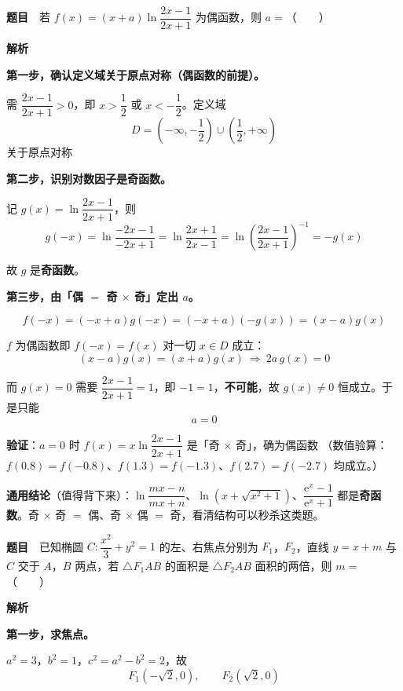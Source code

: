 \par\medskip


\textbf{题目}　若 $f(x)=(x+a)\ln\dfrac{2x-1}{2x+1}$ 为偶函数，则 $a=$（　　）

\textbf{解析}

\textbf{第一步，确认定义域关于原点对称（偶函数的前提）。}

需 $\dfrac{2x-1}{2x+1}>0$，即 $x>\dfrac12$ 或 $x<-\dfrac12$。定义域
\[D=\left(-\infty,-\frac12\right)\cup\left(\frac12,+\infty\right)\]
关于原点对称 

\textbf{第二步，识别对数因子是奇函数。}

记 $g(x)=\ln\dfrac{2x-1}{2x+1}$，则
\[g(-x)=\ln\frac{-2x-1}{-2x+1}=\ln\frac{2x+1}{2x-1}=\ln\left(\frac{2x-1}{2x+1}\right)^{-1}=-g(x)\]

故 $g$ 是\textbf{奇函数}。

\textbf{第三步，由「偶 $=$ 奇 $\times$ 奇」定出 $a$。}

\[f(-x)=(-x+a)g(-x)=(-x+a)\left(-g(x)\right)=(x-a)g(x)\]

$f$ 为偶函数即 $f(-x)=f(x)$ 对一切 $x\in D$ 成立：
\[(x-a)g(x)=(x+a)g(x)\ \Longrightarrow\ 2a\,g(x)=0\]

而 $g(x)=0$ 需要 $\dfrac{2x-1}{2x+1}=1$，即 $-1=1$，\textbf{不可能}，故 $g(x)\ne0$ 恒成立。于是只能
\[a=0\]

\textbf{验证}：$a=0$ 时 $f(x)=x\ln\dfrac{2x-1}{2x+1}$ 是「奇 $\times$ 奇」，确为偶函数 （数值验算：$f(0.8)=f(-0.8)$、$f(1.3)=f(-1.3)$、$f(2.7)=f(-2.7)$ 均成立。）


\begin{gktip}
\textbf{通用结论}（值得背下来）：$\ln\dfrac{mx-n}{mx+n}$、$\ln\left(x+\sqrt{x^{2}+1}\right)$、$\dfrac{\mathrm e^{x}-1}{\mathrm e^{x}+1}$ 都是\textbf{奇函数}。奇 $\times$ 奇 $=$ 偶、奇 $\times$ 偶 $=$ 奇，看清结构可以秒杀这类题。
\end{gktip}

\par\medskip


\textbf{题目}　已知椭圆 $C:\dfrac{x^{2}}3+y^{2}=1$ 的左、右焦点分别为 $F_1$，$F_2$，直线 $y=x+m$ 与 $C$ 交于 $A$，$B$ 两点，若 $\triangle F_1AB$ 的面积是 $\triangle F_2AB$ 面积的两倍，则 $m=$（　　）

\textbf{解析}

\textbf{第一步，求焦点。}

$a^{2}=3$，$b^{2}=1$，$c^{2}=a^{2}-b^{2}=2$，故
\[F_1\left(-\sqrt2,0\right),\qquad F_2\left(\sqrt2,0\right)\]

